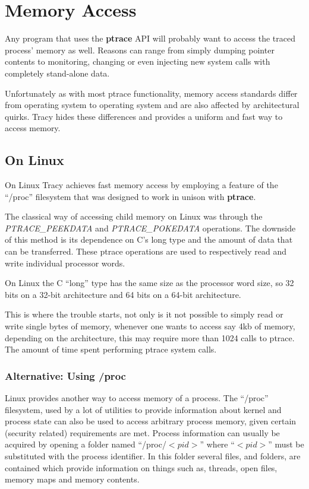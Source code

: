 \documentclass[a4paper, 10pt]{report}
\begin{document}
\section{Memory Access}


Any program that uses the \textbf{ptrace} API will probably want to access the
traced process' memory as well. Reasons can range from simply dumping pointer
contents to monitoring, changing or even injecting new system calls with
completely stand-alone data.

Unfortunately as with most ptrace functionality, memory access standards
differ from operating system to operating system and are also
affected by architectural quirks. Tracy hides these differences and
provides a uniform and fast way to access memory.

\subsection{On Linux}
On Linux Tracy achieves fast memory access by employing a feature of the
``/proc'' filesystem that was designed to work in unison with
\textbf{ptrace}.

The classical way of accessing child memory on Linux was through the
\textit{PTRACE\_PEEKDATA} and \textit{PTRACE\_POKEDATA} operations.
The downside of this method is its dependence on C's long type and the
amount of data that can be transferred.
These ptrace operations are used to respectively read and write individual
processor words.

On Linux the C ``long'' type has the same size as the
processor word size, so 32 bits on a 32-bit architecture and
64 bits on a 64-bit architecture.

This is where the trouble starts, not only is it not possible to simply read
or write single bytes of memory, whenever one wants to access say 4kb of
memory, depending on the architecture, this may require more than 1024
calls to ptrace. The amount of time spent performing ptrace system calls.

\subsubsection{Alternative: Using /proc}
Linux provides another way to access memory of a process. The ``/proc''
filesystem, used by a lot of utilities to provide information about kernel
and process state can also be used to access arbitrary process memory,
given certain (security related) requirements are met.
Process information can usually be acquired by opening a folder
named ``/proc/$<pid>$'' where ``$<pid>$'' must be substituted with the process
identifier. In this folder several files, and folders, are contained which
provide information on things such as, threads, open files, memory maps and
memory contents.
\end{document}
